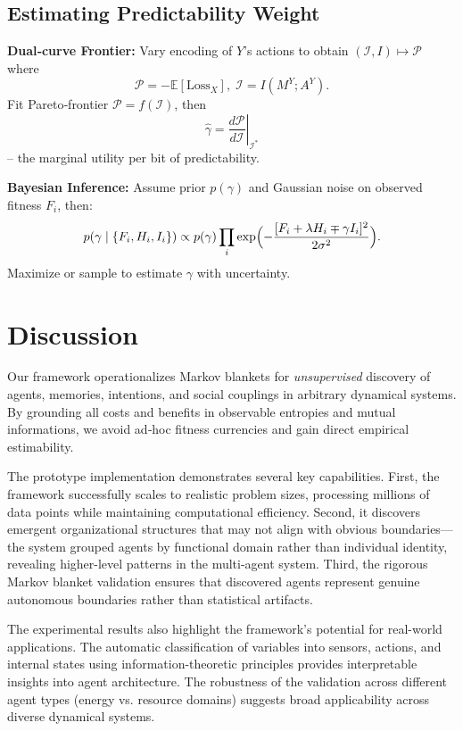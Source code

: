 \documentclass[10pt,conference]{IEEEtran}
\begin{document}
\subsection{Estimating Predictability Weight}
\textbf{Dual‐curve Frontier:} Vary encoding of $Y$'s actions to obtain $(\mathcal I,I)\mapsto\mathcal P$ where
\[\mathcal P=-\mathbb{E}[\mathrm{Loss}_X],\;\mathcal I=I(M^Y;A^Y).\]
Fit Pareto‐frontier $\mathcal P=f(\mathcal I)$, then
\[
\hat\gamma=\left.\frac{d\mathcal P}{d\mathcal I}\right|_{\mathcal I^*}
\]
-- the marginal utility per bit of predictability.  

\textbf{Bayesian Inference:} Assume prior $p(\gamma)$ and Gaussian noise on observed fitness $F_i$, then:
\[
 p(\gamma\mid\{F_i,H_i,I_i\})\propto p(\gamma)\prod_i\exp\Bigl(-\frac{[F_i+\lambda H_i\mp\gamma I_i]^2}{2\sigma^2}\Bigr).
\]
Maximize or sample to estimate $\gamma$ with uncertainty.


\section{Discussion}
Our framework operationalizes Markov blankets for \emph{unsupervised} discovery of agents, memories, intentions, and social couplings in arbitrary dynamical systems.  By grounding all costs and benefits in observable entropies and mutual informations, we avoid ad‐hoc fitness currencies and gain direct empirical estimability.

The prototype implementation demonstrates several key capabilities. First, the framework successfully scales to realistic problem sizes, processing millions of data points while maintaining computational efficiency. Second, it discovers emergent organizational structures that may not align with obvious boundaries—the system grouped agents by functional domain rather than individual identity, revealing higher-level patterns in the multi-agent system. Third, the rigorous Markov blanket validation ensures that discovered agents represent genuine autonomous boundaries rather than statistical artifacts.

The experimental results also highlight the framework's potential for real-world applications. The automatic classification of variables into sensors, actions, and internal states using information-theoretic principles provides interpretable insights into agent architecture. The robustness of the validation across different agent types (energy vs. resource domains) suggests broad applicability across diverse dynamical systems.
\end{document}
